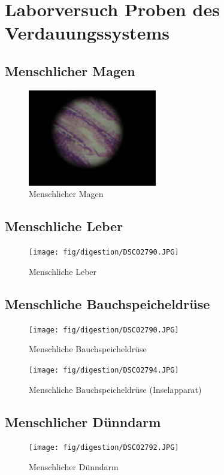 \section{Laborversuch Proben des Verdauungssystems}

\subsection{Menschlicher Magen}
\begin{figure}[h!]
    \centering
    \includegraphics[width=0.5\textwidth]{fig/digestion/DSC02784.JPG}
    \caption{Menschlicher Magen}
    \label{fig:human_stomach}
\end{figure}
\clearpage

\subsection{Menschliche Leber}
\begin{figure}[h!]
    \centering
    \texttt{[image: fig/digestion/DSC02790.JPG]}
    \caption{Menschliche Leber}
    \label{fig:human_liver}
\end{figure}
\clearpage

\subsection{Menschliche Bauchspeicheldrüse}
\begin{figure}[h!]
    \centering
    \texttt{[image: fig/digestion/DSC02790.JPG]}
    \caption{Menschliche Bauchspeicheldrüse}
    \label{fig:human_pancreas}
\end{figure}
\begin{figure}[h!]
    \centering
    \texttt{[image: fig/digestion/DSC02794.JPG]}
    \caption{Menschliche Bauchspeicheldrüse (Inselapparat)}
    \label{fig:human_pancreas_2}
\end{figure}
\clearpage

\subsection{Menschlicher Dünndarm}
\begin{figure}[h!]
    \centering
    \texttt{[image: fig/digestion/DSC02792.JPG]}
    \caption{Menschlicher Dünndarm}
    \label{fig:human_mamal_lieum}
\end{figure}

